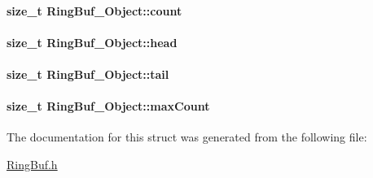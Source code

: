 \paragraph[{count}]{\setlength{\rightskip}{0pt plus 5cm}size\+\_\+t Ring\+Buf\+\_\+\+Object\+::count}\label{struct_ring_buf___object_ae0c8cf16fcfb34570c11db5f5af7aaf0}
\paragraph[{head}]{\setlength{\rightskip}{0pt plus 5cm}size\+\_\+t Ring\+Buf\+\_\+\+Object\+::head}\label{struct_ring_buf___object_a39b92dd09345c4799adf2de4920af5e3}
\paragraph[{tail}]{\setlength{\rightskip}{0pt plus 5cm}size\+\_\+t Ring\+Buf\+\_\+\+Object\+::tail}\label{struct_ring_buf___object_ab792bbd6ff48d13ae09eedc33bb79289}
\paragraph[{max\+Count}]{\setlength{\rightskip}{0pt plus 5cm}size\+\_\+t Ring\+Buf\+\_\+\+Object\+::max\+Count}\label{struct_ring_buf___object_afdea48daa7a86ad212139842569b8a3f}


The documentation for this struct was generated from the following file\+:\begin{DoxyCompactItemize}
\item 
\hyperlink{_ring_buf_8h}{Ring\+Buf.\+h}\end{DoxyCompactItemize}
